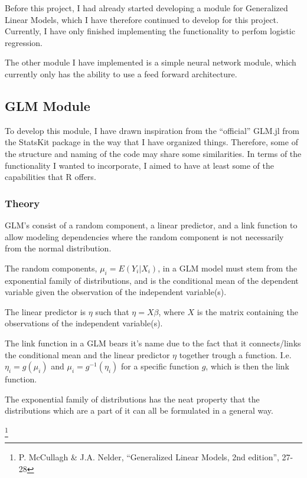 \documentclass[]{article}
\let\rmarkdownfootnote\footnote%
\def\footnote{\protect\rmarkdownfootnote}
\begin{document}
Before this project, I had already started developing a module for
Generalized Linear Models, which I have therefore continued to develop
for this project. Currently, I have only finished implementing the
functionality to perfom logistic regression.

The other module I have implemented is a simple neural network module,
which currently only has the ability to use a feed forward architecture.

\subsection{GLM Module}\label{glm-module}

To develop this module, I have drawn inspiration from the ``official''
GLM.jl from the StatsKit package in the way that I have organized
things. Therefore, some of the structure and naming of the code may
share some similarities. In terms of the functionality I wanted to
incorporate, I aimed to have at least some of the capabilities that R
offers.

\subsubsection{Theory}\label{theory}

GLM's consist of a random component, a linear predictor, and a link
function to allow modeling dependencies where the random component is
not necessarily from the normal distribution.

The random components, \(\mu_i = E(Y_i|X_i)\), in a GLM model must stem
from the exponential family of distributions, and is the conditional
mean of the dependent variable given the observation of the independent
variable(s).

The linear predictor is \(\eta\) such that \(\eta = X\beta\), where
\(X\) is the matrix containing the observations of the independent
variable(s).

The link function in a GLM bears it's name due to the fact that it
connects/links the conditional mean and the linear predictor \(\eta\)
together trough a function. I.e. \(\eta_i = g(\mu_i)\) and
\(\mu_i = g^{-1}(\eta_i)\) for a specific function \(g\), which is then
the link function.

The exponential family of distributions has the neat property that the
distributions which are a part of it can all be formulated in a general
way.

\footnote{P. McCullagh \& J.A. Nelder, ``Generalized Linear Models, 2nd
  edition'', 27-28}
\end{document}

